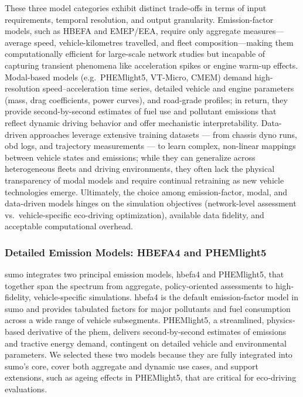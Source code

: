 These three model categories exhibit distinct trade-offs in terms of input requirements, temporal resolution, and output granularity. Emission-factor models, such as HBEFA and EMEP/EEA, require only aggregate measures—average speed, vehicle-kilometres travelled, and fleet composition—making them computationally efficient for large-scale network studies but incapable of capturing transient phenomena like acceleration spikes or engine warm-up effects. Modal-based models (e.g.\ PHEMlight5, VT-Micro, CMEM) demand high-resolution speed–acceleration time series, detailed vehicle and engine parameters (mass, drag coefficients, power curves), and road-grade profiles; in return, they provide second-by-second estimates of fuel use and pollutant emissions that reflect dynamic driving behavior and offer mechanistic interpretability. Data-driven approaches leverage extensive training datasets --- from chassis dyno runs, \ac{obd} logs, and trajectory measurements --- to learn complex, non-linear mappings between vehicle states and emissions; while they can generalize across heterogeneous fleets and driving environments, they often lack the physical transparency of modal models and require continual retraining as new vehicle technologies emerge. Ultimately, the choice among emission-factor, modal, and data-driven models hinges on the simulation objectives (network-level assessment vs.\ vehicle-specific eco-driving optimization), available data fidelity, and acceptable computational overhead.  

\subsubsection{Detailed Emission Models: HBEFA4 and PHEMlight5}
\label{subsubsec:detailed_emission_models}

\ac{sumo} integrates two principal emission models, \ac{hbefa}4 and PHEMlight5, that together span the spectrum from aggregate, policy‐oriented assessments to high‐fidelity, vehicle‐specific simulations. \ac{hbefa}4 is the default emission‐factor model in \ac{sumo} and provides tabulated factors for major pollutants and fuel consumption across a wide range of vehicle subsegments. PHEMlight5, a streamlined, physics‐based derivative of the \ac{phem}, delivers second‐by‐second estimates of emissions and tractive energy demand, contingent on detailed vehicle and environmental parameters. We selected these two models because they are fully integrated into \ac{sumo}’s core, cover both aggregate and dynamic use cases, and support extensions, such as ageing effects in PHEMlight5, that are critical for eco‐driving evaluations. \cite{Krajzewicz2002}

